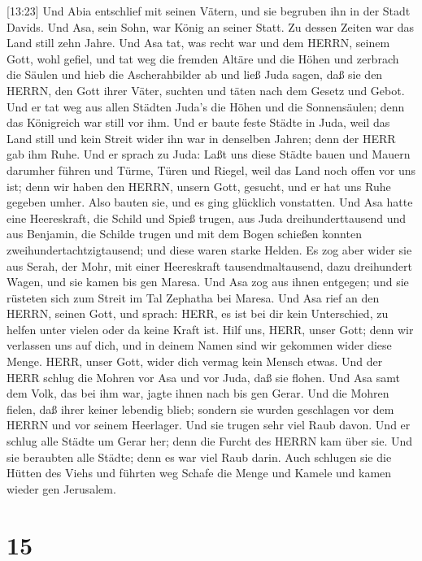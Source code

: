  {[}13:23{]} Und Abia entschlief mit seinen Vätern, und sie
begruben ihn in der Stadt Davids. Und Asa, sein Sohn, war König an
seiner Statt. Zu dessen Zeiten war das Land still zehn Jahre.
 Und Asa tat, was recht war und dem HERRN, seinem Gott, wohl
gefiel,  und tat weg die fremden Altäre und die Höhen und
zerbrach die Säulen und hieb die Ascherahbilder ab  und ließ
Juda sagen, daß sie den HERRN, den Gott ihrer Väter, suchten und täten
nach dem Gesetz und Gebot.  Und er tat weg aus allen Städten
Juda's die Höhen und die Sonnensäulen; denn das Königreich war still vor
ihm.  Und er baute feste Städte in Juda, weil das Land still
und kein Streit wider ihn war in denselben Jahren; denn der HERR gab ihm
Ruhe.  Und er sprach zu Juda: Laßt uns diese Städte bauen
und Mauern darumher führen und Türme, Türen und Riegel, weil das Land
noch offen vor uns ist; denn wir haben den HERRN, unsern Gott, gesucht,
und er hat uns Ruhe gegeben umher. Also bauten sie, und es ging
glücklich vonstatten.  Und Asa hatte eine Heereskraft, die
Schild und Spieß trugen, aus Juda dreihunderttausend und aus Benjamin,
die Schilde trugen und mit dem Bogen schießen konnten
zweihundertachtzigtausend; und diese waren starke Helden. 
Es zog aber wider sie aus Serah, der Mohr, mit einer Heereskraft
tausendmaltausend, dazu dreihundert Wagen, und sie kamen bis gen Maresa.
 Und Asa zog aus ihnen entgegen; und sie rüsteten sich zum
Streit im Tal Zephatha bei Maresa.  Und Asa rief an den
HERRN, seinen Gott, und sprach: HERR, es ist bei dir kein Unterschied,
zu helfen unter vielen oder da keine Kraft ist. Hilf uns, HERR, unser
Gott; denn wir verlassen uns auf dich, und in deinem Namen sind wir
gekommen wider diese Menge. HERR, unser Gott, wider dich vermag kein
Mensch etwas.  Und der HERR schlug die Mohren vor Asa und
vor Juda, daß sie flohen.  Und Asa samt dem Volk, das bei
ihm war, jagte ihnen nach bis gen Gerar. Und die Mohren fielen, daß
ihrer keiner lebendig blieb; sondern sie wurden geschlagen vor dem HERRN
und vor seinem Heerlager. Und sie trugen sehr viel Raub davon.
 Und er schlug alle Städte um Gerar her; denn die Furcht
des HERRN kam über sie. Und sie beraubten alle Städte; denn es war viel
Raub darin.  Auch schlugen sie die Hütten des Viehs und
führten weg Schafe die Menge und Kamele und kamen wieder gen Jerusalem.

\hypertarget{section-14}{%
\section{15}\label{section-14}}

